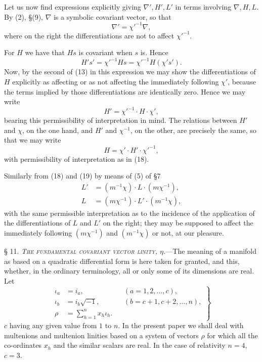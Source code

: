 \documentclass[11pt]{article}
\begin{document}
\indent Let us now find expressions explicitly giving $\nabla',H',L'$ in terms involving $\nabla,H,L$. By (2), §(9), $\nabla$ is a symbolic covariant vector, so that
\begin{equation}\nabla'=\chi'^{-1}\nabla,\tag{17}\end{equation}
where on the right the differentiations are not to affect $\chi'^{-1}$.

\indent For $H$ we have that $Hs$ is covariant when $s$ is. Hence
\[
H's'=\chi'^{-1}Hs=\chi'^{-1}H(\chi's').
\]
Now, by the second of (13) in this expression we may show the differentiations of $H$ explicitly as affecting or as not affecting the immediately following $\chi'$, because the terms implied by those differentiations are identically zero. Hence we may write
\begin{equation}H'=\chi'^{-1}\cdot H\cdot\chi',\tag{18}\end{equation}
bearing this permissibility of interpretation in mind. The relations between
$H'$ and $\chi$, on the one hand, and $H'$ and $\chi^{-1}$, on the other, are precisely the same, so that we may write
\begin{equation}H=\chi'\cdot H'\cdot\chi'^{-1},\tag{19}\end{equation}
with permissibility of interpretation as in (18).

\indent Similarly from (18) and (19) by means of (5) of §7
\begin{align}
L'&=(m^{-1}\chi)\cdot L\cdot(m\chi^{-1}),\tag{20}\\
L&=(m\chi^{-1})\cdot L'\cdot(m^{-1}\chi),\tag{21}
\end{align}
with the same permissible interpretation as to the incidence of the application of the differentiations of $L$ and $L'$ on the right; they may be supposed to affect the immediately following $(m\chi^{-1})$ and $(m^{-1}\chi)$ or not, at our pleasure.

\noindent\textsc{§ 11. \emph{The fundamental covariant vector linity, $\eta$.}}---The meaning of a manifold as based on a quadratic differential form is here taken for granted, and this, whether, in the ordinary terminology, all or only some of its dimensions are real. Let
\begin{equation}\left.\begin{aligned}
\iota_a&=i_a, &&(a=1,2,\ldots,c),\\
\iota_b&=i_b\sqrt{-1}, &&(b=c+1,c+2,\ldots,n),\\
\rho&=\sum_{h=1}^n x_h\iota_h.
\end{aligned}\right\}\tag{1}\end{equation}
$c$ having any given value from $1$ to $n$. In the present paper we shall deal with multenions and multenion linities based on a system of vectors $\rho$ for which all the co-ordinates $x_h$ and the similar scalars are real. In the case of relativity $n=4$, $c=3$.
\end{document}
